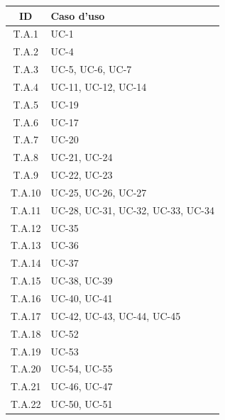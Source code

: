 \begin{tabularx}{\textwidth}{|c|X|}
    \hline
    \textbf{ID} & \textbf{Caso d'uso}\\
    \hline
    \label{ta:trace_ta1}T.A.1 & UC-1\\
    \hline
    \label{ta:trace_ta2}T.A.2 & UC-4\\
    \hline
    \label{ta:trace_ta3}T.A.3 & UC-5, UC-6, UC-7\\
    \hline
    \label{ta:trace_ta4}T.A.4 & UC-11, UC-12, UC-14\\
    \hline
    \label{ta:trace_ta5}T.A.5 & UC-19\\
    \hline
    \label{ta:trace_ta6}T.A.6 & UC-17\\
    \hline
    \label{ta:tarce_ta7}T.A.7 & UC-20\\
    \hline
    \label{ta:trace_ta8}T.A.8 & UC-21, UC-24\\
    \hline
    \label{ta:trace_ta9}T.A.9 & UC-22, UC-23\\
    \hline
    \label{ta:trace_ta10}T.A.10 & UC-25, UC-26, UC-27\\
    \hline
    \label{ta:trace_ta11}T.A.11 & UC-28, UC-31, UC-32, UC-33, UC-34\\
    \hline
    \label{ta:trace_ta12}T.A.12 & UC-35\\
    \hline
    \label{ta:trace_ta13}T.A.13 & UC-36\\
    \hline
    \label{ta:trace_ta14}T.A.14 & UC-37\\
    \hline
    \label{ta:trace_ta15}T.A.15 & UC-38, UC-39\\
    \hline
    \label{ta:trace_ta16}T.A.16 & UC-40, UC-41\\
    \hline
    \label{ta:trace_ta17}T.A.17 & UC-42, UC-43, UC-44, UC-45\\
    \hline 
    \label{ta:trace_ta18}T.A.18 & UC-52\\
    \hline
    \label{ta:trace_ta19}T.A.19 & UC-53\\
    \hline
    \label{ta:trace_ta20}T.A.20 & UC-54, UC-55\\
    \hline
    \label{ta:trace_ta21}T.A.21 & UC-46, UC-47\\
    \hline
    \label{ta:tarce_ta22}T.A.22 & UC-50, UC-51\\
    \hline
\end{tabularx}




